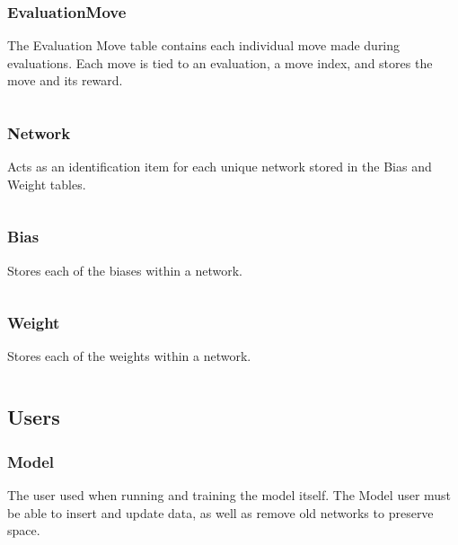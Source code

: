 \documentclass[12pt]{article}
\begin{document}
\inputminted{SQL}{../../sql/tables/evaluation.sql}

\subsubsection{EvaluationMove}

The Evaluation Move table contains each individual move made during evaluations. Each move is tied to an evaluation, a move index, and stores the move and its reward.

\inputminted{SQL}{../../sql/tables/evaluationmove.sql}

\subsubsection{Network}

Acts as an identification item for each unique network stored in the Bias and Weight tables.

\inputminted{SQL}{../../sql/tables/network.sql}

\subsubsection{Bias}

Stores each of the biases within a network.

\inputminted{SQL}{../../sql/tables/bias.sql}

\subsubsection{Weight}

Stores each of the weights within a network.

\inputminted{SQL}{../../sql/tables/weight.sql}

\subsection{Users}

\subsubsection{Model}

The user used when running and training the model itself. The Model user must be able to insert and update data, as well as remove old networks to preserve space.

\inputminted{SQL}{../../sql/users/model.sql}
\end{document}
